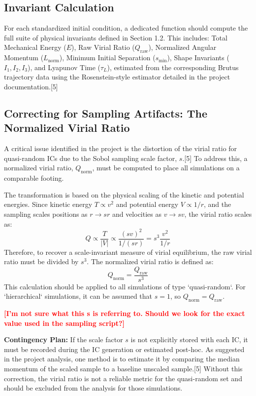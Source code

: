 \documentclass[11pt, letterpaper]{article}
\newcommand{\authcomment}[1]{\textcolor{red}{\textbf{[#1]}}}
\begin{document}
\subsection{Invariant Calculation}

For each standardized initial condition, a dedicated function should compute the full suite of physical invariants defined in Section 1.2. This includes:
Total Mechanical Energy ($E$), Raw Virial Ratio ($Q_{\text{raw}}$), Normalized Angular Momentum ($L_{\text{norm}}$), Minimum Initial Separation ($s_{\text{min}}$), Shape Invariants ($I_1, I_2, I_3$), and Lyapunov Time ($\tau_L$), estimated from the corresponding Brutus trajectory data using the Rosenstein-style estimator detailed in the project documentation.[5]

\subsection{Correcting for Sampling Artifacts: The Normalized Virial Ratio}

A critical issue identified in the project is the distortion of the virial ratio for quasi-random ICs due to the Sobol sampling scale factor, $s$.[5] To address this, a normalized virial ratio, $Q_{\text{norm}}$, must be computed to place all simulations on a comparable footing.

The transformation is based on the physical scaling of the kinetic and potential energies. Since kinetic energy $T \propto v^2$ and potential energy $V \propto 1/r$, and the sampling scales positions as $r \to sr$ and velocities as $v \to sv$, the virial ratio scales as:
$$Q \propto \frac{T}{|V|} \propto \frac{(sv)^2}{1/(sr)} = s^3 \frac{v^2}{1/r}$$
Therefore, to recover a scale-invariant measure of virial equilibrium, the raw virial ratio must be divided by $s^3$. The normalized virial ratio is defined as:
$$Q_{\text{norm}} = \frac{Q_{\text{raw}}}{s^3}$$
This calculation should be applied to all simulations of type `quasi-random`. For `hierarchical` simulations, it can be assumed that $s=1$, so $Q_{\text{norm}} = Q_{\text{raw}}$.

\authcomment{I'm not sure what this s is referring to. Should we look for the exact value used in the sampling script?}

\textbf{Contingency Plan:} If the scale factor $s$ is not explicitly stored with each IC, it must be recorded during the IC generation or estimated post-hoc. As suggested in the project analysis, one method is to estimate it by comparing the median momentum of the scaled sample to a baseline unscaled sample.[5] Without this correction, the virial ratio is not a reliable metric for the quasi-random set and should be excluded from the analysis for those simulations.
\end{document}
